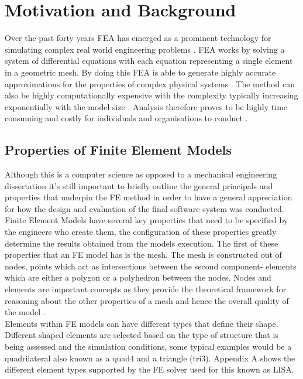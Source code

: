 
\section{Motivation and Background}
Over the past forty years FEA has emerged as a prominent technology for simulating complex real world engineering problems \cite{cite0, DolsakPaper94}. FEA works by solving a system of differential equations with each equation representing a single element in a geometric mesh. By doing this FEA is able to generate highly accurate approximations for the properties of complex physical systems \cite{DolsakPaper94} \cite{IntroductionToFE}. The method can also be highly computationally expensive with the complexity typically increasing exponentially with the model size \cite{DolsakPaper94}. Analysis therefore proves to be highly time consuming and costly for individuals and organisations to conduct \cite{ConsultRuleIntelltSystemFE} \cite{cite03}.\\


\subsection{Properties of Finite Element Models}
Although this is a computer science as opposed to a mechanical engineering dissertation it's still important to briefly outline the general principals and properties that underpin the FE method in order to have a general appreciation for how the design and evaluation of the final software system was conducted. \\ 

\noindent
Finite Element Models have several key properties that need to be specified by the engineers who create them, the configuration of these properties greatly determine the results obtained from the models execution. The first of these properties that an FE model has is the mesh. The mesh is constructed out of nodes, points which act as intersections between the second component- elements which are either a polygon or a polyhedron between the nodes. Nodes and elements are important concepts as they provide the theoretical framework for reasoning about the other properties of a mesh and hence the overall quality of the model \cite{IntroductionToFE}.\\ 

\noindent
Elements within FE models can have different types that define their shape. Different shaped elements are selected based on the type of structure that is being assessed and the simulation conditions, some typical examples would be a quadrilateral also known as a quad4 and a triangle (tri3). Appendix A shows the different element types supported by the FE solver used for this known as LISA. \\ 

